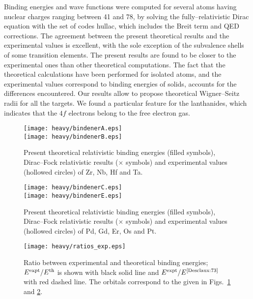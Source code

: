 Binding energies and wave functions were computed for several atoms
having nuclear charges ranging between 41 and 78, by solving the
fully--relativistic Dirac equation with the set of codes {\sc hullac}, which
includes the Breit term and QED corrections. The agreement between the
present theoretical results and the experimental values is excellent,
with the sole exception of the subvalence shells of some transition
elements. The present results are found to be closer to the experimental 
ones than other theoretical computations. 
The fact that the theoretical calculations have been performed
for isolated atoms, and
the experimental values correspond to binding energies of solids,
accounts for the differences encountered. 
Our results allow to propose theoretical Wigner--Seitz radii for all 
the targets. We found a particular feature for the lanthanides, which
indicates that the $4f$ electrons belong to the free electron gas.


\onecolumn
\begin{figure}[h]
\centering
 \texttt{[image: heavy/bindenerA.eps]} \\
 \vspace{0.075\textheight}
 \texttt{[image: heavy/bindenerB.eps]}
\caption{Present theoretical relativistic binding energies
(filled symbols), Dirac--Fock relativistic results \cite{Desclaux:73}
($\times$ symbols) and experimental values \cite{expdata} (hollowed 
circles) of Zr, Nb, Hf and Ta.}
\label{fig:fig1}
\end{figure}
\begin{figure}[h]
\centering
 \texttt{[image: heavy/bindenerC.eps]} \\
 \vspace{0.075\textheight}
 \texttt{[image: heavy/bindenerE.eps]}
\caption{Present theoretical relativistic binding energies
(filled symbols), Dirac--Fock relativistic results \cite{Desclaux:73}
($\times$ symbols) and experimental values \cite{expdata} (hollowed 
circles) of Pd, Gd, Er, Os and Pt.}
\label{fig:fig2}
\end{figure}

\begin{figure}
 \centering
 \texttt{[image: heavy/ratios\_exp.eps]}
\caption{Ratio between experimental and theoretical binding energies;
$E^{\mbox{\scriptsize expt}}/E^{\mbox{\scriptsize th}}$ is shown with
black solid line and $E^{\mbox{\scriptsize expt}}/E^{\mbox{\scriptsize \cite{Desclaux:73}}}$
with red dashed line. The orbitals correspond to the given in 
Figs.~\ref{fig:fig1} and \ref{fig:fig2}.}
\label{fig:ratios}
\end{figure}
 

